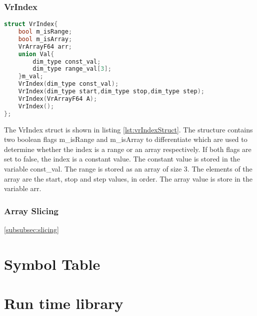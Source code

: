 \subsubsection{VrIndex}
\label{subsubsec:vrindex}
\begin{lstlisting}[language=c,caption={VrIndex Structure},label={lst:vrIndexStruct}]
struct VrIndex{ 
	bool m_isRange; 
	bool m_isArray; 
	VrArrayF64 arr;      
	union Val{ 
		dim_type const_val; 
		dim_type range_val[3]; 
	}m_val; 
	VrIndex(dim_type const_val);
	VrIndex(dim_type start,dim_type stop,dim_type step);
	VrIndex(VrArrayF64 A);
	VrIndex();
};
\end{lstlisting}
The VrIndex struct is shown in listing \ref{lst:vrIndexStruct}. The structure contains two boolean flags m\_isRange and m\_isArray to differentiate which are used to determine whether the index is a range or an array respectively. If both flags are set to false, the index is a constant value. The constant value is stored in the variable const\_val. The range is stored as an array of size 3. The elements of the array are the start, stop and step values, in order. The array value is store in the variable arr.
\subsubsection{Array Slicing}
\ref{subsubsec:slicing}
\section{Symbol Table}
\section{Run time library}
